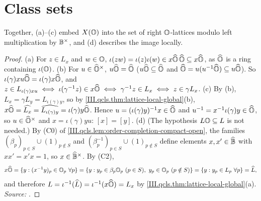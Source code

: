 \section{Class sets}\label{sec:qcls-classes}

\begin{definition}
\end{definition}

\begin{theorem}
\end{theorem}
\noindent Together, (a)--(c) embed $X(\mathbb{O})$ into the set of right $\mathbb{O}$-lattices modulo left multiplication by $\mathbb{B}^\times$, and (d) describes
the image locally.
\begin{proof}
(a) For $z\in L_x$ and $w\in\mathbb{O}$, $\iota(zw)=\iota(z)\iota(w)\in x\widehat{\mathbb{O}}\,\widehat{\mathbb{O}}\subseteq x\widehat{\mathbb{O}}$, as $\widehat{\mathbb{O}}$ is a ring containing $\iota(\mathbb{O})$.
(b) For $u\in\widehat{\mathbb{O}}^\times$, $u\widehat{\mathbb{O}}=\widehat{\mathbb{O}}$ ($u\widehat{\mathbb{O}}\subseteq\widehat{\mathbb{O}}$ and $\widehat{\mathbb{O}}=u(u^{-1}\widehat{\mathbb{O}})\subseteq u\widehat{\mathbb{O}}$). So $\iota(\gamma)xu\widehat{\mathbb{O}}=\iota(\gamma)x\widehat{\mathbb{O}}$, and
$z\in L_{\iota(\gamma)xu}\iff\iota(\gamma^{-1}z)\in x\widehat{\mathbb{O}}\iff\gamma^{-1}z\in L_x\iff z\in\gamma L_x$.
(c) By (b), $L_x=\gamma L_y=L_{\iota(\gamma)y}$, so by \cref{III.qcls.thm:lattice-local-global}(b), $x\widehat{\mathbb{O}}=\widehat{L_x}=\widehat{L_{\iota(\gamma)y}}=\iota(\gamma)y\widehat{\mathbb{O}}$.
Hence $u=(\iota(\gamma)y)^{-1}x\in\widehat{\mathbb{O}}$ and $u^{-1}=x^{-1}\iota(\gamma)y\in\widehat{\mathbb{O}}$, so $u\in\widehat{\mathbb{O}}^\times$ and $x=\iota(\gamma)yu$: $[x]=[y]$.
(d) (The hypothesis $L\mathbb{O}\subseteq L$ is not needed.) By (C0) of \cref{III.qcls.lem:order-completion-compact-open}, the families $(\beta_p)_{p\in S}\cup(1)_{p\notin
S}$ and $(\beta_p^{-1})_{p\in S}\cup(1)_{p\notin S}$ define elements $x,x'\in\widehat{\mathbb{B}}$ with $xx'=x'x=1$, so $x\in\widehat{\mathbb{B}}^\times$. By (C2),
\[
  x\widehat{\mathbb{O}}=\{y:(x^{-1}y)_p\in\mathbb{O}_p\ \forall p\}=\{y:y_p\in\beta_p\mathbb{O}_p\ (p\in S),\ y_p\in\mathbb{O}_p\ (p\notin S)\}=\{y:y_p\in L_p\ \forall p\}=\widehat{L},
\]
and therefore $L=\iota^{-1}(\widehat{L})=\iota^{-1}(x\widehat{\mathbb{O}})=L_x$ by \cref{III.qcls.thm:lattice-local-global}(a). \emph{Source:} \cite[§27.6]{Voi}.
\end{proof}

